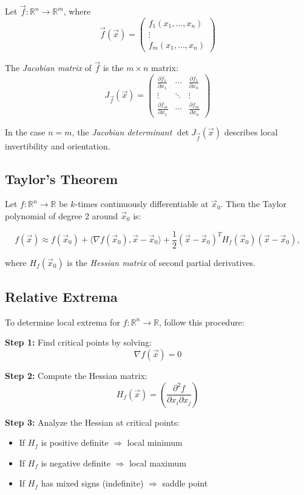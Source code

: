 Let \( \vec{f} : \mathbb{R}^n \to \mathbb{R}^m \), where
\[
\vec{f}(\vec{x}) = \begin{pmatrix}
f_1(x_1, \dots, x_n) \\
\vdots \\
f_m(x_1, \dots, x_n)
\end{pmatrix}
\]

The \emph{Jacobian matrix} of \( \vec{f} \) is the \( m \times n \) matrix:
\[
J_{\vec{f}}(\vec{x}) = \begin{pmatrix}
\frac{\partial f_1}{\partial x_1} & \cdots & \frac{\partial f_1}{\partial x_n} \\
\vdots & \ddots & \vdots \\
\frac{\partial f_m}{\partial x_1} & \cdots & \frac{\partial f_m}{\partial x_n}
\end{pmatrix}
\]

In the case \( n = m \), the \emph{Jacobian determinant} \( \det J_{\vec{f}}(\vec{x}) \) 
describes local invertibility and orientation.


\subsection{Taylor's Theorem}

Let \( f : \mathbb{R}^n \to \mathbb{R} \) be \( k \)-times continuously differentiable at \( \vec{x}_0 \). Then the Taylor polynomial of degree 2 around \( \vec{x}_0 \) is:

\[
f(\vec{x}) \approx f(\vec{x}_0) + \langle \nabla f(\vec{x}_0), \vec{x} - \vec{x}_0 \rangle + \frac{1}{2} {(\vec{x} - \vec{x}_0)}^T H_f(\vec{x}_0)(\vec{x} - \vec{x}_0),
\]

where \( H_f(\vec{x}_0) \) is the \emph{Hessian matrix} of second partial derivatives.


\subsection{Relative Extrema}

To determine local extrema for \( f : \mathbb{R}^n \to \mathbb{R} \), follow this procedure:

\textbf{Step 1:} Find critical points by solving:
\[
\nabla f(\vec{x}) = 0
\]

\textbf{Step 2:} Compute the Hessian matrix:
\[
H_f(\vec{x}) = \left( \frac{\partial^2 f}{\partial x_i \partial x_j} \right)
\]

\textbf{Step 3:} Analyze the Hessian at critical points:
\begin{itemize}[label=\(-\)]
\item If \( H_f \) is positive definite \( \Rightarrow \) local minimum
\item If \( H_f \) is negative definite \( \Rightarrow \) local maximum
\item If \( H_f \) has mixed signs (indefinite) \( \Rightarrow \) saddle point
\end{itemize}

